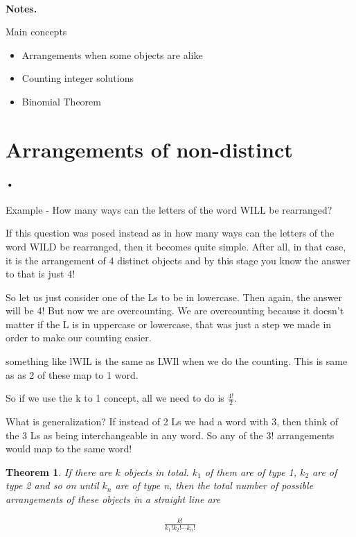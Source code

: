 \documentclass[12pt]{article}
\newtheorem{theorem}{Theorem}
\begin{document}
\begin{center}
\\
\vspace{1cm}
\end{center}


\medskip\noindent

{\bf Notes.}

Main concepts

\begin{itemize}
\item Arrangements when some objects are alike
\item Counting integer solutions
\item Binomial Theorem
\end{itemize}
\vspace{0.5cm}\noindent

\section*{Arrangements of non-distinct}

\paragraph*{•}
Example - How many ways can the letters of the word WILL be rearranged?

If this question was posed instead as in how many ways can the letters of the word WILD be rearranged, then it becomes quite simple. After all, in that case, it is the arrangement of 4 distinct objects and by this stage you know the answer to that is just 4!

So let us just consider one of the Ls to be in lowercase. Then again, the answer will be 4! But now we are overcounting. We are overcounting because it doesn't matter if the L is in uppercase or lowercase, that was just a step we made in order to make our counting easier.

something like lWIL is the same as LWIl when we do the counting. This is same as as 2 of these map to 1 word.

So if we use the k to 1 concept, all we need to do is $\frac{4!}{2}$.

What is generalization? If instead of 2 Ls we had a word with 3, then think of the 3 Ls as being interchangeable in any word. So any of the 3! arrangements would map to the same word!

\begin{theorem}
If there are $k$ objects in total. $k_1$ of them are of type 1, $k_2$ are of type 2 and so on until $k_n$ are of type n, then the total number of possible arrangements of these objects in a straight line are 

\begin{align*}
\frac{k!}{k_1!k_2!\cdots k_n!}
\end{align*}

\end{theorem}
\end{document}

